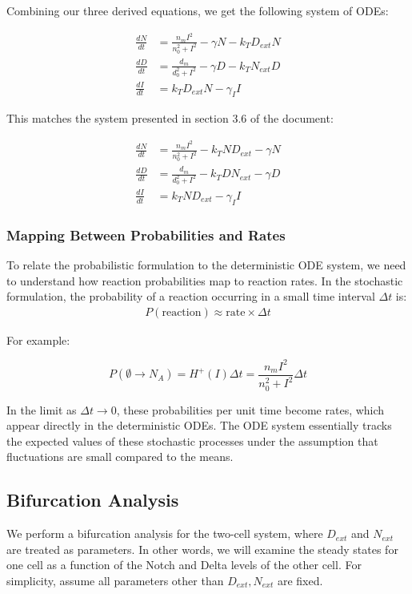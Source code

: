 \documentclass{article}
\begin{document}
\begin{flushleft}
Combining our three derived equations, we get the following system of ODEs:

\begin{align*}
\frac{dN}{dt} &= \frac{n_m I^2}{n_0^2 + I^2} - \gamma N - k_T D_{ext} N \\
\frac{dD}{dt} &= \frac{d_m}{d_0^2 + I^2} - \gamma D - k_T N_{ext} D \\
\frac{dI}{dt} &= k_T D_{ext} N - \gamma_I I
\end{align*}

This matches the system presented in section 3.6 of the document:

\begin{align*}
\frac{dN}{dt} &= \frac{n_m I^2}{n_0^2 + I^2} - k_T N D_{ext} - \gamma N \\
\frac{dD}{dt} &= \frac{d_m}{d_0^2 + I^2} - k_T D N_{ext} - \gamma D \\
\frac{dI}{dt} &= k_T N D_{ext} - \gamma_I I
\end{align*}

\subsubsection{Mapping Between Probabilities and Rates}

To relate the probabilistic formulation to the deterministic ODE system, we need to understand how reaction probabilities map to reaction rates. In the stochastic formulation, the probability of a reaction occurring in a small time interval $\Delta t$ is:
\begin{align*}
P(\text{reaction}) \approx \text{rate} \times \Delta t
\end{align*}

For example:

\[
P(\emptyset \rightarrow N_A) = H^+(I) \Delta t = \frac{n_m I^2}{n_0^2 + I^2} \Delta t 
\]

In the limit as $\Delta t \rightarrow 0$, these probabilities per unit time become rates, which appear directly in the deterministic ODEs. The ODE system essentially tracks the expected values of these stochastic processes under the assumption that fluctuations are small compared to the means.

\subsection{Bifurcation Analysis}

We perform a bifurcation analysis for the two-cell system, where $D_{ext}$ and $N_{ext}$ are treated as parameters. In other words, we will examine the steady states for one cell as a function of the Notch and Delta levels of the other cell. For simplicity, assume all parameters other than $D_{ext}, N_{ext}$ are fixed.


\end{flushleft}
\end{document}
